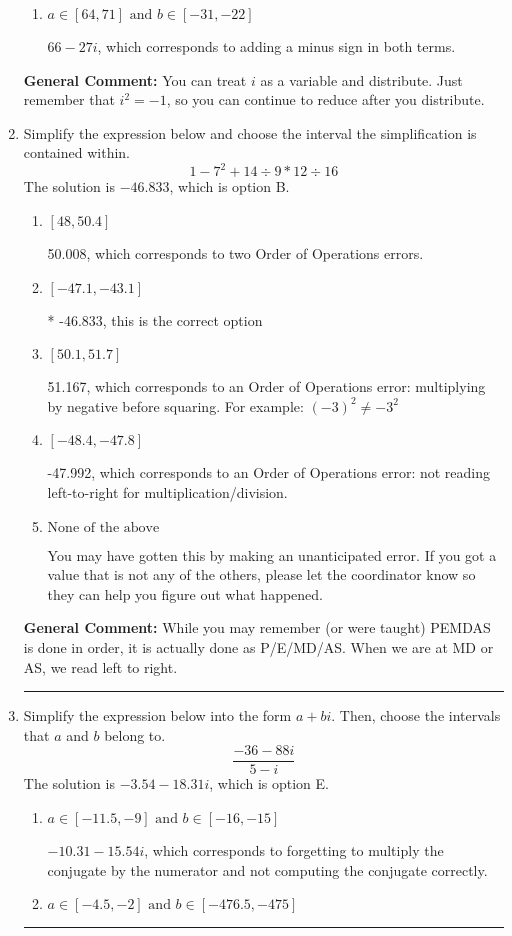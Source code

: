 \documentclass{extbook}[14pt]
\newcommand{\litem}[1]{\item #1

\rule{\textwidth}{0.4pt}}
\begin{document}
\begin{enumerate}
{\begin{enumerate}[label=\Alph*.]
 $-18 + 69 i$, which corresponds to adding a minus sign in the first term.
\item \( a \in [64, 71] \text{ and } b \in [-31, -22] \)

 $66 - 27 i$, which corresponds to adding a minus sign in both terms.
\end{enumerate}

\textbf{General Comment:} You can treat $i$ as a variable and distribute. Just remember that $i^2=-1$, so you can continue to reduce after you distribute.
}
\litem{
Simplify the expression below and choose the interval the simplification is contained within.
\[ 1 - 7^2 + 14 \div 9 * 12 \div 16 \]The solution is \( -46.833 \), which is option B.\begin{enumerate}[label=\Alph*.]
\item \( [48, 50.4] \)

 50.008, which corresponds to two Order of Operations errors.
\item \( [-47.1, -43.1] \)

* -46.833, this is the correct option
\item \( [50.1, 51.7] \)

 51.167, which corresponds to an Order of Operations error: multiplying by negative before squaring. For example: $(-3)^2 \neq -3^2$
\item \( [-48.4, -47.8] \)

 -47.992, which corresponds to an Order of Operations error: not reading left-to-right for multiplication/division.
\item \( \text{None of the above} \)

 You may have gotten this by making an unanticipated error. If you got a value that is not any of the others, please let the coordinator know so they can help you figure out what happened.
\end{enumerate}

\textbf{General Comment:} While you may remember (or were taught) PEMDAS is done in order, it is actually done as P/E/MD/AS. When we are at MD or AS, we read left to right.
}
\litem{
Simplify the expression below into the form $a+bi$. Then, choose the intervals that $a$ and $b$ belong to.
\[ \frac{-36 - 88 i}{5 - i} \]The solution is \( -3.54  - 18.31 i \), which is option E.\begin{enumerate}[label=\Alph*.]
\item \( a \in [-11.5, -9] \text{ and } b \in [-16, -15] \)

 $-10.31  - 15.54 i$, which corresponds to forgetting to multiply the conjugate by the numerator and not computing the conjugate correctly.
\item \( a \in [-4.5, -2] \text{ and } b \in [-476.5, -475] \)


\end{enumerate}}
\end{enumerate}
\end{document}
